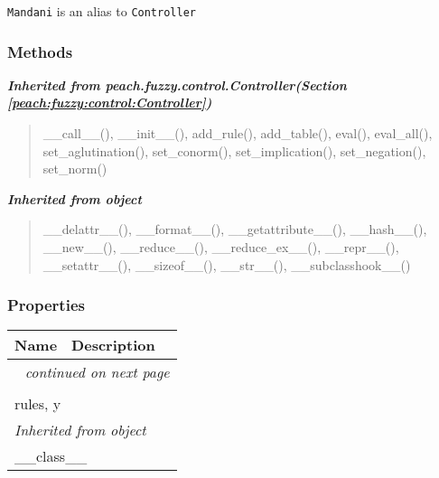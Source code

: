 \texttt{Mandani} is an alias to \texttt{Controller}


  \subsubsection{Methods}


\large{\textbf{\textit{Inherited from peach.fuzzy.control.Controller\textit{(Section \ref{peach:fuzzy:control:Controller})}}}}

\begin{quote}
\_\_call\_\_(), \_\_init\_\_(), add\_rule(), add\_table(), eval(), eval\_all(), set\_aglutination(), set\_conorm(), set\_implication(), set\_negation(), set\_norm()
\end{quote}

\large{\textbf{\textit{Inherited from object}}}

\begin{quote}
\_\_delattr\_\_(), \_\_format\_\_(), \_\_getattribute\_\_(), \_\_hash\_\_(), \_\_new\_\_(), \_\_reduce\_\_(), \_\_reduce\_ex\_\_(), \_\_repr\_\_(), \_\_setattr\_\_(), \_\_sizeof\_\_(), \_\_str\_\_(), \_\_subclasshook\_\_()
\end{quote}


  \subsubsection{Properties}

    \vspace{-1cm}
\hspace{\varindent}\begin{longtable}{|p{\varnamewidth}|p{\vardescrwidth}|l}
\cline{1-2}
\cline{1-2} \centering \textbf{Name} & \centering \textbf{Description}& \\
\cline{1-2}
\endhead\cline{1-2}\multicolumn{3}{r}{\small\textit{continued on next page}}\\\endfoot\cline{1-2}
\endlastfoot\multicolumn{2}{|l|}{\textit{Inherited from peach.fuzzy.control.Controller \textit{(Section \ref{peach:fuzzy:control:Controller})}}}\\
\multicolumn{2}{|p{\varwidth}|}{\raggedright rules, y}\\
\cline{1-2}
\multicolumn{2}{|l|}{\textit{Inherited from object}}\\
\multicolumn{2}{|p{\varwidth}|}{\raggedright \_\_class\_\_}\\
\cline{1-2}
\end{longtable}

